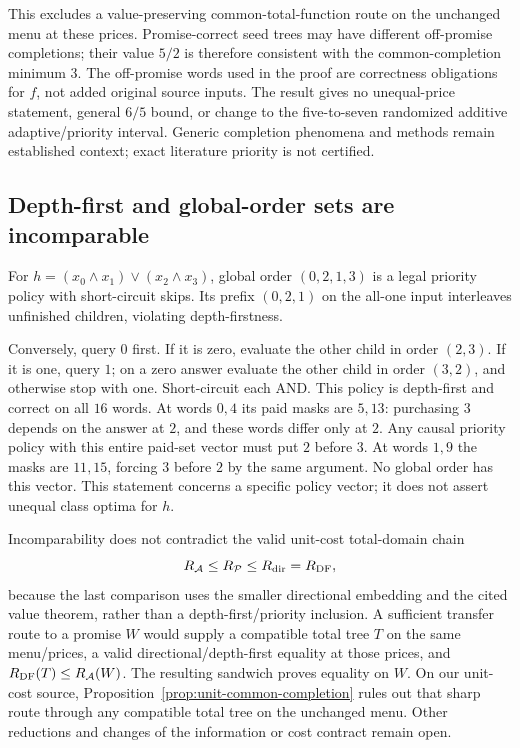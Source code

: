 This excludes a value-preserving common-total-function route on the
unchanged menu at these prices. Promise-correct seed trees may have
different off-promise completions; their value $5/2$ is therefore
consistent with the common-completion minimum $3$. The off-promise
words used in the proof are correctness obligations for $f$, not added
original source inputs. The result gives no unequal-price statement,
general $6/5$ bound, or change to the five-to-seven randomized additive
adaptive/priority interval. Generic completion phenomena and methods
remain established context; exact literature priority is not certified.

\subsection{Depth-first and global-order sets are incomparable}
For $h=(x_0\wedge x_1)\vee(x_2\wedge x_3)$, global order $(0,2,1,3)$
is a legal priority policy with short-circuit skips. Its prefix $(0,2,1)$
on the all-one input interleaves unfinished children, violating depth-firstness.

Conversely, query $0$ first. If it is zero, evaluate the other child in
order $(2,3)$. If it is one, query $1$; on a zero answer evaluate the
other child in order $(3,2)$, and otherwise stop with one. Short-circuit
each AND. This policy is depth-first and correct on all $16$ words.
At words $0,4$ its paid masks are $5,13$: purchasing $3$ depends on the
answer at $2$, and these words differ only at $2$. Any causal priority
policy with this entire paid-set vector must put $2$ before $3$.
At words $1,9$ the masks are $11,15$, forcing $3$ before $2$ by the same
argument. No global order has this vector. This statement concerns a
specific policy vector; it does not assert unequal class optima for $h$.

Incomparability does not contradict the valid unit-cost total-domain chain
\[
 R_{\mathcal A}\le R_{\mathcal P}\le R_{\rm dir}=R_{\rm DF},
\]
because the last comparison uses the smaller directional embedding and
the cited value theorem, rather than a depth-first/priority inclusion.
A sufficient transfer route to a promise $W$ would supply a compatible
total tree $T$ on the same menu/prices, a valid directional/depth-first
equality at those prices, and $R_{\rm DF}(T)\le R_{\mathcal A}(W)$.
The resulting sandwich proves equality on $W$. On our unit-cost source,
Proposition~\ref{prop:unit-common-completion} rules out that sharp route
through any compatible total tree on the unchanged menu. Other
reductions and changes of the information or cost contract remain open.

